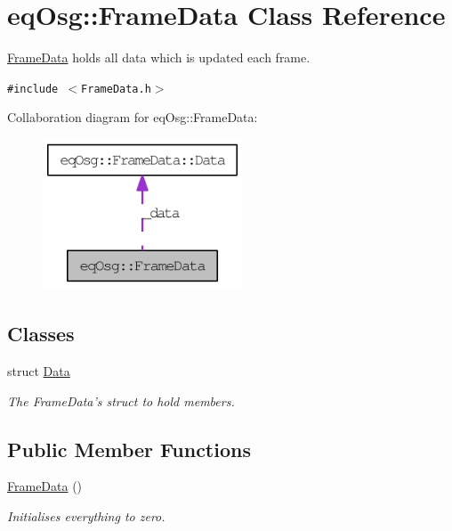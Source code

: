 \hypertarget{a00010}{
\section{eqOsg::FrameData Class Reference}
\label{a00010}
}
\hyperlink{a00010}{FrameData} holds all data which is updated each frame.  


{\tt \#include $<$FrameData.h$>$}

Collaboration diagram for eqOsg::FrameData:\nopagebreak
\begin{figure}[H]
\begin{center}
\leavevmode
\includegraphics[width=168pt]{a00094}
\end{center}
\end{figure}
\subsection*{Classes}
\begin{CompactItemize}
\item 
struct \hyperlink{a00008}{Data}
\begin{CompactList}\small\item\em The FrameData's struct to hold members. \item\end{CompactList}\end{CompactItemize}
\subsection*{Public Member Functions}
\begin{CompactItemize}
\item 
\hyperlink{a00010_25212bee682363205562fae39028c3d6}{FrameData} ()
\begin{CompactList}\small\item\em Initialises everything to zero. \item\end{CompactList}\end{CompactItemize}
